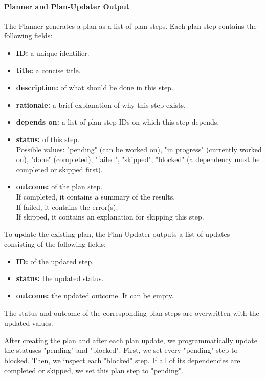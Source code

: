 \documentclass[submission, Phys]{SciPost}
\begin{document}
\paragraph{Planner and Plan-Updater Output}

The Planner generates a plan as a list of plan steps. Each plan step contains the following fields:
\begin{itemize}
    \item \textbf{ID:} a unique identifier.
    \item \textbf{title:} a concise title.
    \item \textbf{description:} of what should be done in this step.
    \item \textbf{rationale:} a brief explanation of why this step exists.
    \item \textbf{depends on:} a list of plan step IDs on which this step depends.
    \item \textbf{status:} of this step.\\
    Possible values: "pending" (can be worked on), "in progress" (currently worked on), "done" (completed), "failed", "skipped", "blocked" (a dependency must be completed or skipped first).
    \item \textbf{outcome:} of the plan step.\\
    If completed, it contains a summary of the results.\\
    If failed, it contains the error(s).\\
    If skipped, it contains an explanation for skipping this step.
\end{itemize}

To update the existing plan, the Plan-Updater outputs a list of updates consisting of the following fields:
\begin{itemize}
    \item \textbf{ID: } of the updated step.
    \item \textbf{status: } the updated status.
    \item \textbf{outcome: } the updated outcome. It can be empty.
\end{itemize}
The status and outcome of the corresponding plan steps are overwritten with the updated values.

After creating the plan and after each plan update, we programmatically update the statuses "pending" and "blocked". First, we set every "pending" step to blocked. Then, we inspect each "blocked" step. If all of its dependencies are completed or skipped, we set this plan step to "pending".
\end{document}
